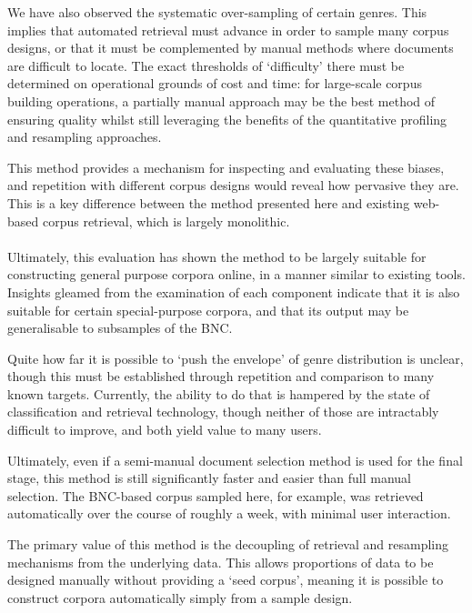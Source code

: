 We have also observed the systematic over-sampling of certain genres.  This implies that automated retrieval must advance in order to sample many corpus designs, or that it must be complemented by manual methods where documents are difficult to locate.  The exact thresholds of `difficulty' there must be determined on operational grounds of cost and time: for large-scale corpus building operations, a partially manual approach may be the best method of ensuring quality whilst still leveraging the benefits of the quantitative profiling and resampling approaches.

This method provides a mechanism for inspecting and evaluating these biases, and repetition with different corpus designs would reveal how pervasive they are.  This is a key difference between the method presented here and existing web-based corpus retrieval, which is largely monolithic.

\paragraph{}

Ultimately, this evaluation has shown the method to be largely suitable for constructing general purpose corpora online, in a manner similar to existing tools.  Insights gleamed from the examination of each component indicate that it is also suitable for certain special-purpose corpora, and that its output may be generalisable to subsamples of the BNC.

Quite how far it is possible to `push the envelope' of genre distribution is unclear, though this must be established through repetition and comparison to many known targets.  Currently, the ability to do that is hampered by the state of classification and retrieval technology, though neither of those are intractably difficult to improve, and both yield value to many users.

Ultimately, even if a semi-manual document selection method is used for the final stage, this method is still significantly faster and easier than full manual selection.  The BNC-based corpus sampled here, for example, was retrieved automatically over the course of roughly a week, with minimal user interaction.

The primary value of this method is the decoupling of retrieval and resampling mechanisms from the underlying data.  This allows proportions of data to be designed manually without providing a `seed corpus', meaning it is possible to construct corpora automatically simply from a sample design.




